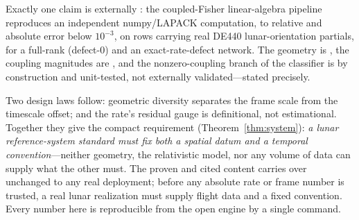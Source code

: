 Exactly one claim is externally \Validated{}: the coupled-Fisher linear-algebra pipeline
reproduces an independent numpy/LAPACK computation, to relative and absolute error below
$10^{-3}$, on rows carrying real DE440 lunar-orientation partials, for a full-rank
(defect-$0$) and an exact-rate-defect network. The geometry is \Modelled{}, the coupling
magnitudes are \Modelled{}, and the nonzero-coupling branch of the classifier is \Proven{} by
construction and unit-tested, not externally validated---stated precisely.

Two design laws follow: geometric diversity separates the frame scale from the timescale
offset; and the rate's residual gauge is definitional, not estimational. Together they give
the compact requirement (Theorem~\ref{thm:system}): \emph{a lunar reference-system standard
must fix both a spatial datum and a temporal convention}---neither geometry, the relativistic
model, nor any volume of data can supply what the other must. The proven and cited content
carries over unchanged to any real deployment; before any absolute rate or frame number is
trusted, a real lunar realization must supply flight data and a fixed convention. Every number
here is reproducible from the open engine by a single command.

